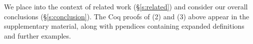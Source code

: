 

 We place \Nec into the context of 
related work (\S\ref{s:related}) and consider our overall conclusions
(\S\ref{s:conclusion}). 
%
The Coq proofs of 
(2) and (3) above appear in the
supplementary material, along with ppendices containing expanded 
definitions and further examples.
